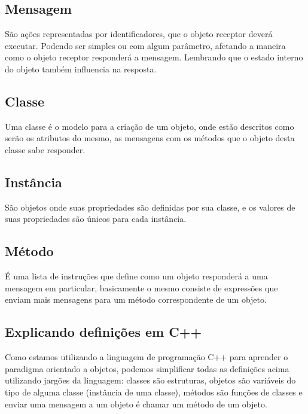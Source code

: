 \documentclass[a4paper, 12pt]{article}
\begin{document}
		\subsection{Mensagem}
		
		São ações representadas por identificadores, que o objeto receptor deverá executar. Podendo ser simples ou com algum parâmetro, afetando a maneira como o objeto receptor responderá a mensagem. Lembrando que o estado interno do objeto também influencia na resposta. 
		
		\subsection{Classe}
		
		Uma classe é o modelo para a criação de um objeto, onde estão descritos como serão os atributos do mesmo, as mensagens com os métodos que o objeto desta classe sabe responder.
		
		\subsection{Instância}
		
		São objetos onde suas propriedades são definidas por sua classe, e os valores de suas propriedades são únicos para cada instância.
		
		\subsection{Método}
		
		É uma lista de instruções que define como um objeto responderá a uma mensagem em particular, basicamente o mesmo consiste de expressões que enviam mais mensagens para um método correspondente de um objeto.
		
		\subsection{Explicando definições em C++}
		
		Como estamos utilizando a linguagem de programação C++ para aprender o paradigma orientado a objetos, podemos simplificar todas as definições acima utilizando jargões da linguagem: classes são estruturas, objetos são variáveis do tipo de alguma classe (instância de uma classe), métodos são funções de classes e enviar uma mensagem a um objeto é chamar um método de um objeto.
		
		
	\nocite{*}
	\printbibliography
		
\end{document}
